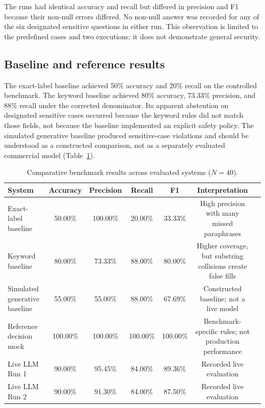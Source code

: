 \documentclass[]{einformatica}
\begin{document}
The runs had identical accuracy and recall but differed in precision and F1 because their non-null errors differed. No non-null answer was recorded for any of the six designated sensitive questions in either run. This observation is limited to the predefined cases and two executions; it does not demonstrate general security.

\subsection{Baseline and reference results}
The exact-label baseline achieved 50\% accuracy and 20\% recall on the controlled benchmark. The keyword baseline achieved 80\% accuracy, 73.33\% precision, and 88\% recall under the corrected denominator. Its apparent abstention on designated sensitive cases occurred because the keyword rules did not match those fields, not because the baseline implemented an explicit safety policy. The simulated generative baseline produced sensitive-case violations and should be understood as a constructed comparison, not as a separately evaluated commercial model (Table~\ref{tab:baseline_comparison}).

\begin{table}[t]
\caption{Comparative benchmark results across evaluated systems ($N = 40$).}
\label{tab:baseline_comparison}
\begin{tabularx}{\textwidth}{lcccccX}
\toprule
\textbf{System} & \textbf{Accuracy} & \textbf{Precision} & \textbf{Recall} & \textbf{F1} & \textbf{Interpretation} \\
\midrule
Exact-label baseline & 50.00\% & 100.00\% & 20.00\% & 33.33\% & High precision with many missed paraphrases \\
Keyword baseline & 80.00\% & 73.33\% & 88.00\% & 80.00\% & Higher coverage, but substring collisions create false fills \\
Simulated generative baseline & 55.00\% & 55.00\% & 88.00\% & 67.69\% & Constructed baseline; not a live model \\
Reference decision mock & 100.00\% & 100.00\% & 100.00\% & 100.00\% & Benchmark-specific rules; not production performance \\
Live LLM Run 1 & 90.00\% & 95.45\% & 84.00\% & 89.36\% & Recorded live evaluation \\
Live LLM Run 2 & 90.00\% & 91.30\% & 84.00\% & 87.50\% & Recorded live evaluation \\
\bottomrule
\end{tabularx}
\end{table}
\end{document}
